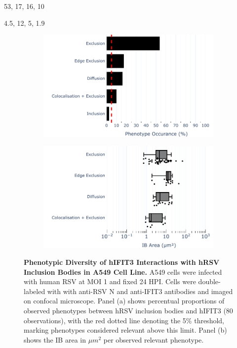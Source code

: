 53, 17, 16, 10

4.5, 12, 5, 1.9

\begin{figure}
    \begin{subfigure}{0.495\textwidth}
        \caption{}
        \includegraphics[width=1\linewidth]{08. Chapter 3/Figs/02. Infection/03. IFIT3/01. bar_i3_a549.pdf} 
    \end{subfigure}
    \begin{subfigure}{0.495\textwidth}
        \caption{}
        \includegraphics[width=1\linewidth]{08. Chapter 3/Figs/02. Infection/03. IFIT3/02. box_i3_a549.pdf}
    \end{subfigure}
    \caption[Phenotypic Diversity of hIFIT3 Interactions with hRSV Inclusion Bodies in A549 Cell Line.]{\textbf{Phenotypic Diversity of hIFIT3 Interactions with hRSV Inclusion Bodies in A549 Cell Line.} A549 cells were infected with human RSV at MOI 1 and fixed 24 HPI. Cells were double-labeled with with anti-RSV N and anti-IFIT3 antibodies and imaged on confocal microscope. Panel (a) shows percentual proportions of observed phenotypes between hRSV inclusion bodies and hIFIT3 (80 observations), with the red dotted line denoting the 5\% threshold, marking phenotypes considered relevant above this limit. Panel (b) shows the IB area in \(\mu m^2\) per observed relevant phenotype.}
    \label{fig:Phenotypic Diversity of hIFIT3 Interactions with hRSV Inclusion Bodies in A549 Cell Line}
\end{figure}


